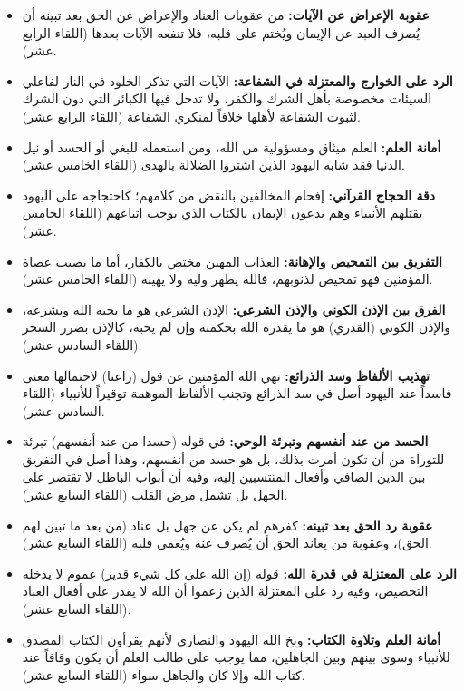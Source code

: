 \begin{itemize}
    \item \textbf{عقوبة الإعراض عن الآيات:} من عقوبات العناد والإعراض عن الحق بعد تبينه أن يُصرف العبد عن الإيمان ويُختم على قلبه، فلا تنفعه الآيات بعدها (اللقاء الرابع عشر).
    \item \textbf{الرد على الخوارج والمعتزلة في الشفاعة:} الآيات التي تذكر الخلود في النار لفاعلي السيئات مخصوصة بأهل الشرك والكفر، ولا تدخل فيها الكبائر التي دون الشرك لثبوت الشفاعة لأهلها خلافاً لمنكري الشفاعة (اللقاء الرابع عشر).
    \item \textbf{أمانة العلم:} العلم ميثاق ومسؤولية من الله، ومن استعمله للبغي أو الحسد أو نيل الدنيا فقد شابه اليهود الذين اشتروا الضلالة بالهدى (اللقاء الخامس عشر).
    \item \textbf{دقة الحجاج القرآني:} إفحام المخالفين بالنقض من كلامهم؛ كاحتجاجه على اليهود بقتلهم الأنبياء وهم يدعون الإيمان بالكتاب الذي يوجب اتباعهم (اللقاء الخامس عشر).
    \item \textbf{التفريق بين التمحيص والإهانة:} العذاب المهين مختص بالكفار، أما ما يصيب عصاة المؤمنين فهو تمحيص لذنوبهم، فالله يطهر وليه ولا يهينه (اللقاء الخامس عشر).
    \item \textbf{الفرق بين الإذن الكوني والإذن الشرعي:} الإذن الشرعي هو ما يحبه الله ويشرعه، والإذن الكوني (القدري) هو ما يقدره الله بحكمته وإن لم يحبه، كالإذن بضرر السحر (اللقاء السادس عشر).
    \item \textbf{تهذيب الألفاظ وسد الذرائع:} نهي الله المؤمنين عن قول (راعنا) لاحتمالها معنى فاسداً عند اليهود أصل في سد الذرائع وتجنب الألفاظ الموهمة توقيراً للأنبياء (اللقاء السادس عشر).
    \item \textbf{الحسد من عند أنفسهم وتبرئة الوحي:} في قوله (حسدا من عند أنفسهم) تبرئة للتوراة من أن تكون أمرت بذلك، بل هو حسد من أنفسهم، وهذا أصل في التفريق بين الدين الصافي وأفعال المنتسبين إليه، وفيه أن أبواب الباطل لا تقتصر على الجهل بل تشمل مرض القلب (اللقاء السابع عشر).
    \item \textbf{عقوبة رد الحق بعد تبينه:} كفرهم لم يكن عن جهل بل عناد (من بعد ما تبين لهم الحق)، وعقوبة من يعاند الحق أن يُصرف عنه ويُعمى قلبه (اللقاء السابع عشر).
    \item \textbf{الرد على المعتزلة في قدرة الله:} قوله (إن الله على كل شيء قدير) عموم لا يدخله التخصيص، وفيه رد على المعتزلة الذين زعموا أن الله لا يقدر على أفعال العباد (اللقاء السابع عشر).
    \item \textbf{أمانة العلم وتلاوة الكتاب:} وبخ الله اليهود والنصارى لأنهم يقرأون الكتاب المصدق للأنبياء وسوى بينهم وبين الجاهلين، مما يوجب على طالب العلم أن يكون وقافاً عند كتاب الله وإلا كان والجاهل سواء (اللقاء السابع عشر).

\end{itemize}
